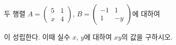 두 행렬 $A=\begin{pmatrix} 5 & 1 \\ x & 4 \end{pmatrix}$, $B=\begin{pmatrix} -1 & 1 \\ 1 & -y \end{pmatrix}$에 대하여 \par\smallskip{}\par\smallskip\noindent 이 성립한다. 이때 실수 $x$, $y$에 대하여 $xy$의 값을 구하시오.
